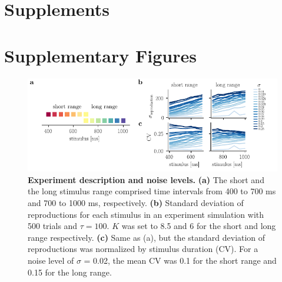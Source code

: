 \documentclass[10pt, a4paper]{article}
\begin{document}
\clearpage

\setcounter{section}{0}
\section*{Supplements}

\setcounter{figure}{0}
\setcounter{table}{0}
\setcounter{equation}{0} 
\renewcommand{\figurename}{Supplementary Figure}
\renewcommand{\tablename}{Supplementary Table}

\section*{Supplementary Figures}
\begin{figure}[!htb]
	\centering
	\includegraphics{figures/supp_CV.pdf}
	\caption{\textbf{Experiment description and noise levels.} 
	\textbf{(a)} The short and the long stimulus range comprised time intervals from 400 to 700 ms and 700 to 1000 ms, respectively.
	\textbf{(b)} Standard deviation of reproductions for each stimulus in an experiment simulation with 500 trials and $\tau=100$. $K$ was set to 8.5 and 6 for the short and long range respectively.
	\textbf{(c)} Same as (a), but the standard deviation of reproductions was normalized by stimulus duration (CV). For a noise level of $\sigma$ = 0.02, the mean CV was 0.1 for the short range and 0.15 for the long range.
	}
\label{sup:CV}
\end{figure}
\end{document}
